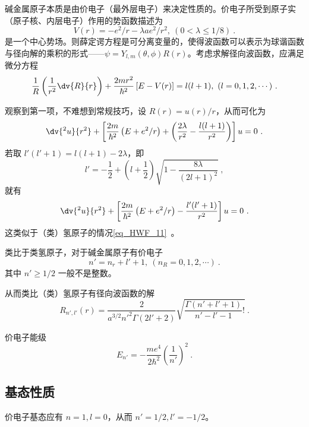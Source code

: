 

碱金属原子本质是由价电子（最外层电子）来决定性质的。价电子所受到原子实（原子核、内层电子）作用的势函数描述为
\begin{equation}
V(r) = -e^2/r - \lambda a e^2/r^2, \ (0 < \lambda \le 1/8) ~.
\end{equation}
是一个中心势场。则薛定谔方程是可分离变量的，使得波函数可以表示为球谐函数与径向解的乘积的形式——$\psi = Y_{l, m}(\theta, \phi) R(r)$。考虑求解径向波函数，应满足微分方程
\begin{equation}\label{eq_AlkmQM_1}
\frac{1}{R} \left(\frac{1}{r^2} \dv{R}{r}\right) + \frac{2mr^2}{\hbar^2} \left[E - V(r)\right] = l(l+1), \ (l = 0, 1, 2, \cdots)~.
\end{equation}

观察到第一项，不难想到常规技巧，设 $R(r) = u(r) /r$，从而可化为
\begin{equation}
\dv{^2 u}{r^2} + \left[\frac{2m}{\hbar^2}\left(E + e^2/r\right) + \left(\frac{2 \lambda}{r^2} - \frac{l(l+1)}{r^2}\right)\right]u = 0 ~.
\end{equation}
若取 $l'(l'+1) = l(l+1) - 2\lambda$，即
$$l' = -\frac12 + \left(l + \frac12\right) \sqrt{1 - \frac{8\lambda}{(2l+1)^2}} ~,$$
就有
\begin{equation}
\dv{^2 u}{r^2} + \left[\frac{2m}{\hbar^2}\left(E + e^2/r\right) - \frac{l'(l'+1)}{r^2}\right]u = 0 ~.
\end{equation}
这类似于（类）氢原子的情况\autoref{eq_HWF_11}~。

类比于类氢原子，对于碱金属原子有价电子
$$n' = n_r + l' + 1, \ (n_R = 0, 1, 2, \cdots) ~.$$
其中 $n' \ge 1/2$ 一般不是整数。

从而类比（类）氢原子有径向波函数的解
\begin{equation}
R_{n', l'}(r) = \frac{2}{a^{3/2} n'^2 \Gamma(2l'+2)}\sqrt{\frac{\Gamma(n'+l'+1)}{n'-l'-1}!} ~.
\end{equation}

价电子能级
\begin{equation}
E_{n'} = -\frac{me^4}{2\hbar^2} \left(\frac{1}{n'}\right)^2 ~.
\end{equation}

\subsection{基态性质}
价电子基态应有 $n=1, l=0$，从而 $n' = 1/2, l'=-1/2$。